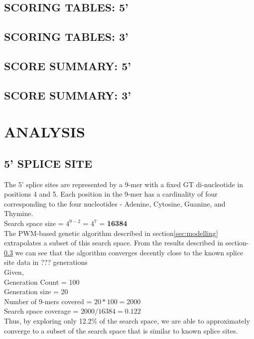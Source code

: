 \documentclass[12pt,a4paper]{article}
\begin{document}
	\subsection{SCORING TABLES: 5'}
	
	\subsection{SCORING TABLES: 3'}
	

	\subsection{SCORE SUMMARY: 5'} \label{score5}
	
	
	\subsection{SCORE SUMMARY: 3'} \label{score3}
	
	
	\section{ANALYSIS}
	\subsection{5' SPLICE SITE}
	The 5' splice sites are represented by a 9-mer with a fixed GT di-nucleotide in positions 4 and 5. Each position in the 9-mer has a cardinality of four corresponding to the four nucleotides - Adenine, Cytosine, Guanine, and Thymine. \\
	Search space size = $4^{9-2}$ = $4^7$ = \textbf{16384} \\
	The PWM-based genetic algorithm described in section\ref{sec:modelling} extrapolates a subset of this search space. From the results described in section-\ref{score5} we can see that the algorithm converges decently close to the known splice site data in ??? generations\\
	Given, \\
	Generation Count = 100 \\
	Generation size = 20 \\
	Number of 9-mers covered = $20 * 100 = 2000 $\\
	Search space coverage = $2000 / 16384 = 0.122$ \\
	Thus, by exploring only 12.2\% of the search space, we are able to approximately converge to a subset of the search space that is similar to known splice sites.
\end{document}
